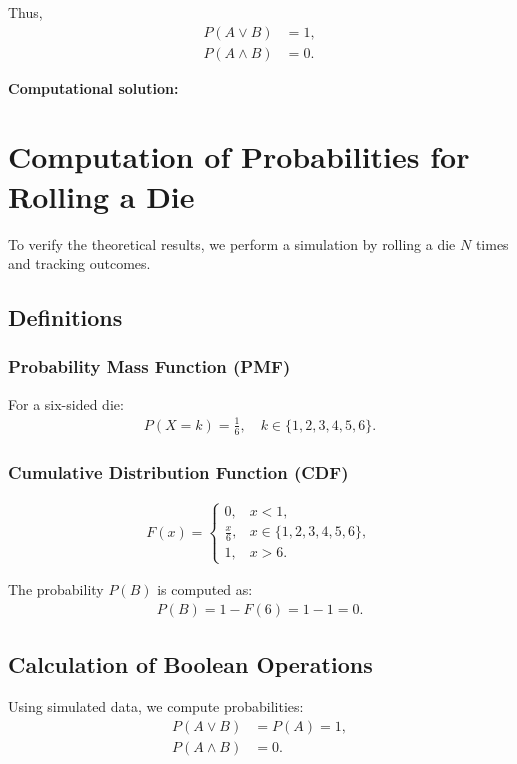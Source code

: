 \documentclass[journal]{IEEEtran}
\numberwithin{equation}{enumi}
\numberwithin{figure}{enumi}
\begin{document}
Thus,
\begin{align}
    P(A \lor B) &= 1, \\
    P(A \land B) &= 0.
\end{align}

\textbf{Computational solution: }\\
\section*{Computation of Probabilities for Rolling a Die}
To verify the theoretical results, we perform a simulation by rolling a die $ N $ times and tracking outcomes.

\subsection*{Definitions}
\subsubsection*{Probability Mass Function (PMF)}
For a six-sided die:
\begin{align}
    P(X = k) = \frac{1}{6}, \quad k \in \{1,2,3,4,5,6\}.
\end{align}

\subsubsection*{Cumulative Distribution Function (CDF)}
\begin{align}
F(x) = \begin{cases} 
0, & x < 1, \\
\frac{x}{6}, & x \in \{1,2,3,4,5,6\}, \\
1, & x > 6.
\end{cases}
\end{align}

The probability $ P(B) $ is computed as:
\begin{align}
    P(B) = 1 - F(6) = 1 - 1 = 0.
\end{align}

\subsection*{Calculation of Boolean Operations}
Using simulated data, we compute probabilities:
\begin{align}
    P(A \lor B) &= P(A) = 1, \\
    P(A \land B) &= 0. \\
\end{align}
\end{document}
